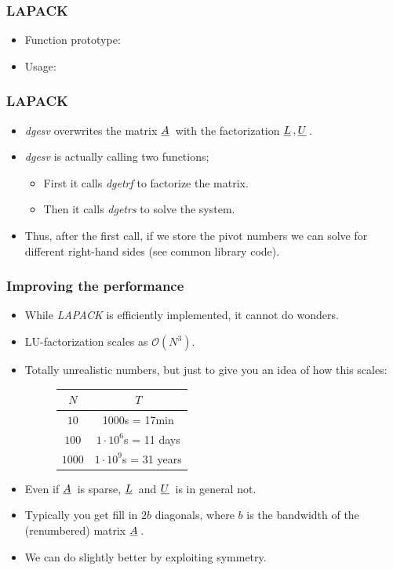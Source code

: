 \documentclass{beamer}
\newcommand{\ub}[1]{\underbar{$#1$}\,}
\begin{document}
\begin{frame}\frametitle{LAPACK}
  \begin{itemize}
    \item Function prototype:
      
    \item Usage:
      
  \end{itemize}
\end{frame}
\begin{frame}\frametitle{LAPACK}
  \begin{itemize}
    \item \emph{dgesv} overwrites the matrix $\ub{A}$ with the factorization $\ub{L}, \ub{U}$.
    \item \emph{dgesv} is actually calling two functions;
      \begin{itemize}
        \item First it calls \emph{dgetrf} to factorize the matrix.
        \item Then it calls \emph{dgetrs} to solve the system.
      \end{itemize}
    \item Thus, after the first call, if we store the pivot numbers we can solve
      for different right-hand sides (see common library code).
  \end{itemize}
\end{frame}
\begin{frame}\frametitle{Improving the performance}
  \begin{itemize}
    \item While \emph{LAPACK} is efficiently implemented, it cannot do wonders.
    \item LU-factorization scales as $\mathcal{O}\left(N^3\right)$.
    \item Totally unrealistic numbers, but just to give you an idea of how this scales:
      \begin{figure}
        \begin{tabular}{c|c}
          $N$ & $T$ \\
          \hline
          $10$ & 1000s = 17min \\
         $100$ & $1\cdot 10^6$s = 11 days \\
         $1000$ & $1\cdot 10^9$s = 31 years 
        \end{tabular}
       \end{figure}
     \item Even if $\ub{A}$ is sparse, $\ub{L}$ and $\ub{U}$ is in general not.
     \item Typically you get fill in $2b$ diagonals, where $b$ is the bandwidth
       of the (renumbered) matrix $\ub{A}$.
     \item We can do slightly better by exploiting symmetry.
  \end{itemize}
\end{frame}
\end{document}
